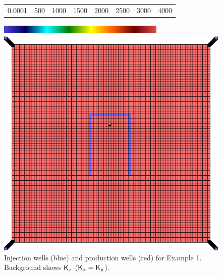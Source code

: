 \documentclass[twocolumn,numbook]{svjour3}          %
\begin{document}
\begin{figure}[ht]
\begin{center}
     \begin{tabular}{cccccccc}
      0.0001 &  500 & 1000 & 1500 & 2000 & 2500 & 3000 &4000
      \end{tabular}
      \includegraphics[width=8cm, height=0.5cm]{VanEssenModelPermeabilityMapColorBar.png}
       
       \medskip

       \includegraphics[totalheight=3.in]{PiPermeabilityMapAndWells.png} 
       \end{center}
     \caption{Injection wells (blue) and production wells (red) for Example 1. Background shows $\mathsf{K}_x$ ($ \mathsf{K}_x = \mathsf{K}_y$).}
  \label{fig:PImodelPermeabilityMapAndWells}
\end{figure}
\end{document}
